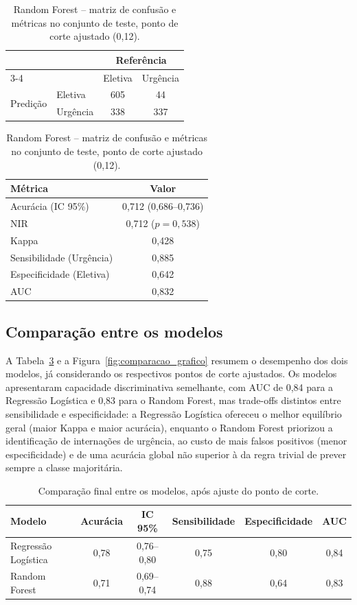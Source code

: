 \documentclass[12pt,a4paper]{article}
\begin{document}
\begin{table}[H]
\centering
\caption{Random Forest -- matriz de confusão e métricas no conjunto de teste, ponto de corte ajustado (0,12).}
\label{tab:rf_resultado}
\begin{tabular}{llcc}
\toprule
& & \multicolumn{2}{c}{Referência} \\
\cmidrule(lr){3-4}
& & Eletiva & Urgência \\
\midrule
\multirow{2}{*}{Predição} & Eletiva & 605 & 44 \\
& Urgência & 338 & 337 \\
\bottomrule
\end{tabular}
\hspace{1.2cm}
\begin{tabular}{lc}
\toprule
Métrica & Valor \\
\midrule
Acurácia (IC 95\%) & 0,712 (0,686--0,736) \\
NIR & 0,712 ($p=0,538$) \\
Kappa & 0,428 \\
Sensibilidade (Urgência) & 0,885 \\
Especificidade (Eletiva) & 0,642 \\
AUC & 0,832 \\
\bottomrule
\end{tabular}
\end{table}

\subsection{Comparação entre os modelos}

A Tabela~\ref{tab:comparacao} e a Figura~\ref{fig:comparacao_grafico} resumem o desempenho dos dois modelos, já considerando os respectivos pontos de corte ajustados. Os modelos apresentaram capacidade discriminativa semelhante, com AUC de 0,84 para a Regressão Logística e 0,83 para o Random Forest, mas trade-offs distintos entre sensibilidade e especificidade: a Regressão Logística ofereceu o melhor equilíbrio geral (maior Kappa e maior acurácia), enquanto o Random Forest priorizou a identificação de internações de urgência, ao custo de mais falsos positivos (menor especificidade) e de uma acurácia global não superior à da regra trivial de prever sempre a classe majoritária.

\begin{table}[H]
\centering
\caption{Comparação final entre os modelos, após ajuste do ponto de corte.}
\label{tab:comparacao}
\begin{tabular}{lccccc}
\toprule
Modelo & Acurácia & IC 95\% & Sensibilidade & Especificidade & AUC \\
\midrule
Regressão Logística & 0,78 & 0,76--0,80 & 0,75 & 0,80 & 0,84 \\
Random Forest & 0,71 & 0,69--0,74 & 0,88 & 0,64 & 0,83 \\
\bottomrule
\end{tabular}
\end{table}
\end{document}

